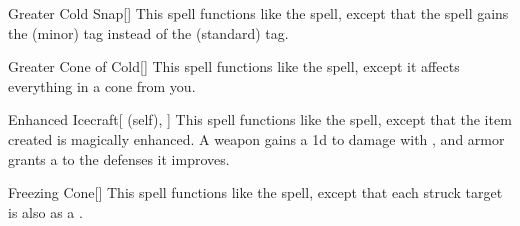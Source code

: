 \lowercase{\hypertarget{spell:Greater Cold Snap}{}}\label{spell:Greater Cold Snap}
\begin{freeability}[Rank 4]{\hypertarget{spell:Greater Cold Snap}{Greater Cold Snap}}[]
This spell functions like the  spell, except that the spell gains the  (minor) tag instead of the  (standard) tag.
\end{freeability}
\vspace{0.25em}



\lowercase{\hypertarget{spell:Greater Cone of Cold}{}}\label{spell:Greater Cone of Cold}
\begin{freeability}[Rank 4]{\hypertarget{spell:Greater Cone of Cold}{Greater Cone of Cold}}[]
This spell functions like the  spell, except it affects everything in a \arealarge cone from you.
\end{freeability}
\vspace{0.25em}



\lowercase{\hypertarget{spell:Enhanced Icecraft}{}}\label{spell:Enhanced Icecraft}
\begin{attuneability}[Rank 5]{\hypertarget{spell:Enhanced Icecraft}{Enhanced Icecraft}}[ (self), ]
This spell functions like the  spell, except that the item created is magically enhanced.
A weapon gains a \plus1d  to damage with , and armor grants a   to the defenses it improves.
\end{attuneability}
\vspace{0.25em}



\lowercase{\hypertarget{spell:Freezing Cone}{}}\label{spell:Freezing Cone}
\begin{freeability}[Rank 5]{\hypertarget{spell:Freezing Cone}{Freezing Cone}}[]
This spell functions like the  spell, except that each struck target is also  as a .
\end{freeability}
\vspace{0.25em}



